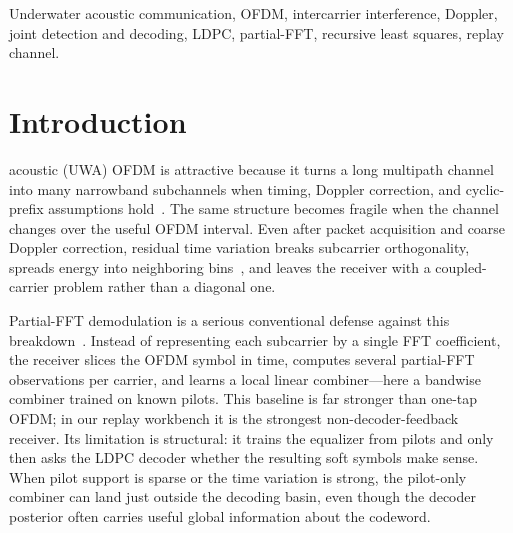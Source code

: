 \documentclass[journal]{IEEEtran}
\begin{document}
\begin{IEEEkeywords}
Underwater acoustic communication, OFDM, intercarrier interference, Doppler,
joint detection and decoding, LDPC, partial-FFT, recursive least squares,
replay channel.
\end{IEEEkeywords}

\section{Introduction}\label{sec:intro}
 acoustic (UWA) OFDM is attractive because it turns a
long multipath channel into many narrowband subchannels when timing, Doppler
correction, and cyclic-prefix assumptions hold~\cite{li2008nonuniform}. The same
structure becomes fragile when the channel changes over the useful OFDM
interval. Even after packet acquisition and coarse Doppler correction, residual
time variation breaks subcarrier orthogonality, spreads energy into neighboring
bins~\cite{berger2010sparse}, and leaves the receiver with a coupled-carrier
problem rather than a diagonal one.

Partial-FFT demodulation is a serious conventional defense against this
breakdown~\cite{yerramalli2012partialfft}. Instead of representing each
subcarrier by a single FFT coefficient, the receiver slices the OFDM symbol in
time, computes several partial-FFT observations per carrier, and learns a local
linear combiner---here a bandwise combiner trained on known pilots. This
baseline is far stronger than one-tap OFDM; in our
replay workbench it is the strongest non-decoder-feedback receiver. Its
limitation is structural: it trains the equalizer from pilots and only then asks
the LDPC decoder whether the resulting soft symbols make sense. When pilot
support is sparse or the time variation is strong, the pilot-only combiner can
land just outside the decoding basin, even though the decoder posterior often
carries useful global information about the codeword.
\end{document}
